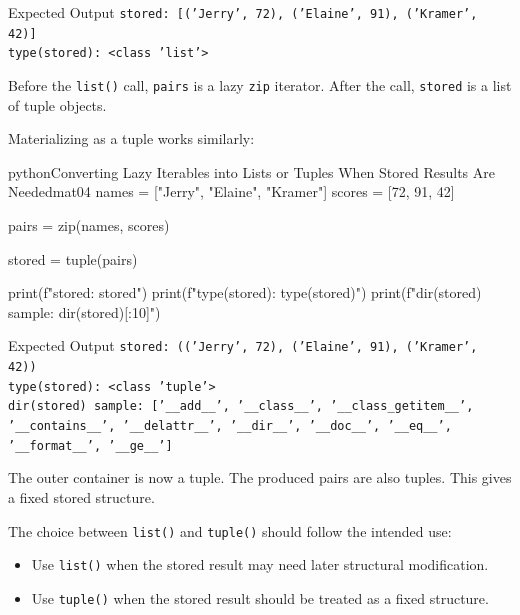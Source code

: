 \documentclass[a4paper,twoside]{report}
\begin{document}
\begin{iobox}{Expected Output}
\texttt{stored: [('Jerry', 72), ('Elaine', 91), ('Kramer', 42)]} \\
\texttt{type(stored): <class 'list'>} \\
\end{iobox}


Before the \texttt{list()} call, \texttt{pairs} is a lazy \texttt{zip} iterator. After the call, \texttt{stored} is a list of tuple objects.

Materializing as a tuple works similarly:

\begin{codebox}[]{python}{Converting Lazy Iterables into Lists or Tuples When Stored Results Are Needed}{mat04}
names = ["Jerry", "Elaine", "Kramer"]
scores = [72, 91, 42]

pairs = zip(names, scores)

stored = tuple(pairs)

print(f"stored: {stored}")
print(f"type(stored): {type(stored)}")
print(f"dir(stored) sample: {dir(stored)[:10]}")
\end{codebox}


\begin{iobox}{Expected Output}
\texttt{stored: (('Jerry', 72), ('Elaine', 91), ('Kramer', 42))} \\
\texttt{type(stored): <class 'tuple'>} \\
\texttt{dir(stored) sample: ['\_\_add\_\_', '\_\_class\_\_', '\_\_class\_getitem\_\_',} \\
\texttt{'\_\_contains\_\_', '\_\_delattr\_\_', '\_\_dir\_\_', '\_\_doc\_\_', '\_\_eq\_\_',} \\
\texttt{'\_\_format\_\_', '\_\_ge\_\_']} \\
\end{iobox}


The outer container is now a tuple. The produced pairs are also tuples. This gives a fixed stored structure.

The choice between \texttt{list()} and \texttt{tuple()} should follow the intended use:

\begin{itemize}
    \item Use \texttt{list()} when the stored result may need later structural modification.
    \item Use \texttt{tuple()} when the stored result should be treated as a fixed structure.
\end{itemize}
\end{document}
